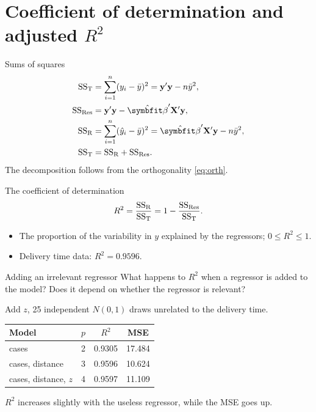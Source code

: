 \section{Coefficient of determination and adjusted \texorpdfstring{$R^2$}{R squared}}


\begin{frame}{Sums of squares}
    \begin{align}
        \SST &= \sum_{i=1}^n (y_i-\bar y)^2 = \by'\by - n\bar y^2, \notag\\
        \SSRes &= \by'\by - \hat{\bbeta}'\bX'\by, \notag\\
        \SSR &= \sum_{i=1}^n (\hat y_i-\bar y)^2 = \hat{\bbeta}'\bX'\by - n\bar y^2, \notag\\
        \SST &= \SSR + \SSRes. \label{eq:ss-decomp}
    \end{align}
    The decomposition follows from the orthogonality \eqref{eq:orth}.
\end{frame}


\begin{frame}{The coefficient of determination}
    \begin{align}
        R^2 = \frac{\mathrm{SS}_{\mathrm{R}}}{\mathrm{SS}_{\mathrm{T}}} = 1 - \frac{\mathrm{SS}_{\mathrm{Res}}}{\mathrm{SS}_{\mathrm{T}}}. \label{eq:r2}
    \end{align}
    \begin{itemize}
        \item The proportion of the variability in $y$ explained by the regressors; $0\le R^2\le 1$.
        \item Delivery time data: $R^2 = 0.9596$.
    \end{itemize}
\end{frame}


\begin{frame}{Adding an irrelevant regressor}
    What happens to $R^2$ when a regressor is added to the model? Does it depend on whether the regressor is relevant?


    \svspace{1em}

    Add $z$, 25 independent $N(0,1)$ draws unrelated to the delivery time.
    \begin{center}
        \small
        \begin{tabular}{lccc}
            \toprule
            Model & $p$ & $R^2$ & MSE \\
            \midrule
            cases                       & 2 & 0.9305  & 17.484 \\
            cases, distance             & 3 & 0.9596  & 10.624 \\
            cases, distance, $z$        & 4 & 0.9597  & 11.109 \\
            \bottomrule
        \end{tabular}
    \end{center}
    $R^2$ increases slightly with the useless regressor, while the MSE goes up.
\end{frame}


